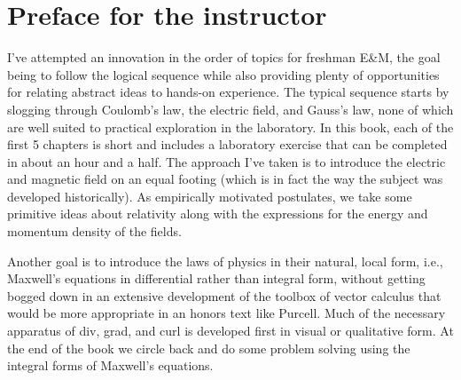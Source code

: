 \section*{Preface for the instructor}%

I've attempted an innovation in the order of topics for freshman E\&M,
the goal being to follow the logical sequence while also providing
plenty of opportunities for relating abstract ideas to hands-on
experience. The typical sequence starts by slogging through Coulomb's
law, the electric field, and Gauss's law, none of which are well
suited to practical exploration in the laboratory. In this book, each of the 
first 5 chapters is short and includes a laboratory exercise that can
be completed in about an hour and a half. The approach I've taken is
to introduce the electric and magnetic field on an equal footing
(which is in fact the way the subject was developed historically). As
empirically motivated postulates, we take some primitive ideas about
relativity along with the expressions for the energy and momentum
density of the fields. 

Another goal is to introduce the laws of physics in their natural,
local form, i.e., Maxwell's equations in differential rather than
integral form, without getting bogged down in an extensive development
of the toolbox of vector calculus that would be more appropriate in an
honors text like Purcell. Much of the necessary apparatus of div,
grad, and curl is developed first in visual or qualitative form. At
the end of the book we circle back and do some problem solving using
the integral forms of Maxwell's equations. 
